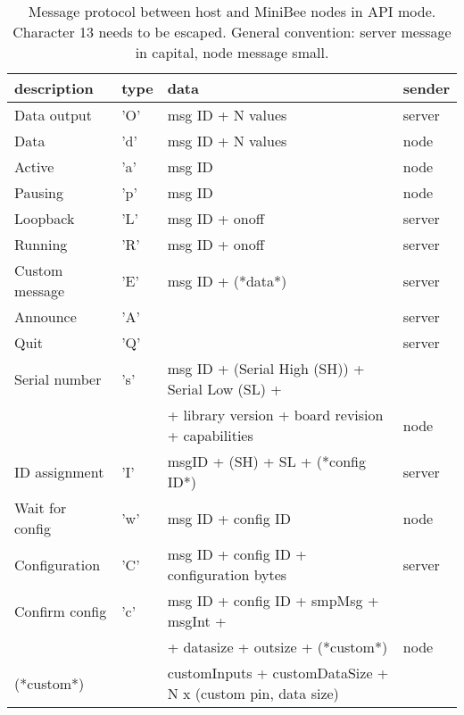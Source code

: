 \documentclass[letterpaper,10pt]{article}
\begin{document}
\begin{table}
 
\begin{center}
\begin{tabular}{llll}
description & type & data & sender\\
\hline
Data output & 'O' & msg ID + N values & server\\
Data & 'd' & msg ID + N values & node\\
Active & 'a' & msg ID & node\\
Pausing & 'p' & msg ID & node\\
Loopback & 'L' & msg ID + onoff & server\\
Running & 'R' & msg ID + onoff & server\\
Custom message & 'E' & msg ID + (*data*) & server\\
\hline
Announce & 'A' &  & server \\
Quit & 'Q' &  & server \\
Serial number & 's' & msg ID + (Serial High (SH)) + Serial Low (SL) +& \\
			&	  & + library version + board revision + capabilities & node\\
ID assignment & 'I' & msgID + (SH) + SL + (*config ID*) & server \\
Wait for config & 'w' & msg ID + config ID & node \\
Configuration & 'C' & msg ID + config ID + configuration bytes & server \\
Confirm config & 'c' & msg ID + config ID + smpMsg + msgInt + & \\
                           &        & + datasize + outsize + (*custom*) & node \\
(*custom*) &  & customInputs + customDataSize + N x (custom pin, data size) & \\
\hline
\end{tabular}
\end{center}
\caption{Message protocol between host and MiniBee nodes in API mode. Character 13 needs to be escaped. General convention: server message in capital, node message small.}
\end{table}
\end{document}

